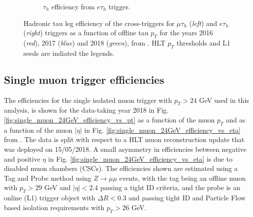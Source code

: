 \begin{figure}[h]
\begin{subfigure}{0.45\textwidth}
        \caption{$\tau_{h}$ efficiency from $e\tau_{h}$ trigger.}
        \label{fig:etauEfficiencyPt_eachYear_mediumTauMVA_Data}
    \end{subfigure}
    \caption[Hadronic tau leg efficiency of the cross-triggers for $\mu\tau_{h}$ (\textit{left}) and $e\tau_{h}$ (\textit{right}) triggers as a function of offline tau $p_{T}$ for 2016, 2017, and 2018.]{Hadronic tau leg efficiency of the cross-triggers for $\mu\tau_{h}$ (\textit{left}) and $e\tau_{h}$ (\textit{right}) triggers as a function of offline tau $p_{T}$ for the years 2016 (\textit{red}), 2017 (\textit{blue}) and 2018 (\textit{green}), from \cite{twiki_Tau_Lepton_Run_2_trigger_performance}. HLT $p_{T}$ thresholds and L1 seeds are indiated the legends.} 
\end{figure}


\subsection{Single muon trigger efficiencies}
The efficiencies for the single isolated muon trigger with $p_{T} > 24$ GeV used in this analysis, is shown for the data-taking year 2018 in Fig. \ref{fig:single_muon_24GeV_efficiency_vs_pt} as a function of the muon $p_{T}$ and as a function of the muon $|\eta|$ in Fig. \ref{fig:single_muon_24GeV_efficiency_vs_eta} from \cite{CMS-DP-2018-034}. The data is split with respect to a HLT muon reconstruction update that was deployed on 15/05/2018. A small asymmetry in efficiencies between negative and positive $\eta$ in Fig. \ref{fig:single_muon_24GeV_efficiency_vs_eta} is due to disabled muon chambers (CSCs). The efficiencies shown are estimated using a Tag and Probe method using $Z\rightarrow \mu\mu$ events, with the tag being an offline muon with $p_{T} > 29$ GeV and $|\eta| < 2.4$ passing a tight ID criteria, and the probe is an online (L1) trigger object with $\Delta R < 0.3$ and passing tight ID and Particle Flow based isolation requirements with $p_{T} > 26$ GeV.

